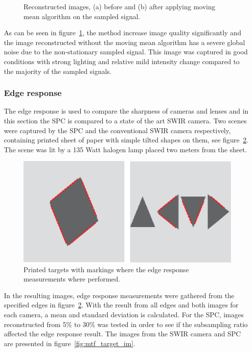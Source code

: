 \begin{figure}[H]
\begin{minipage}[t]{0.49\textwidth}
	\subcaption{}
	\label{lc_af}
\end{minipage}
	\caption{Reconstructed images, (a) before and (b) after applying moving mean algorithm on the sampled signal.}
	\label{fig:lc_image}
\end{figure}

As can be seen in figure~\ref{fig:lc_image}, the method increase image quality significantly and the image reconstructed without the moving mean algorithm has a severe global noise due to the non-stationary sampled signal. This image was captured in good conditions with strong lighting and relative mild intensity change compared to the majority of the sampled signals.


\subsubsection{Edge response}
The edge response is used to compare the sharpness of cameras and lenses and in this section the SPC is compared to a state of the art SWIR camera. Two scenes were captured by the SPC and the conventional SWIR camera respectively, containing printed sheet of paper with simple tilted shapes on them, see figure~\ref{fig:mtf_target}. The scene was lit by a 135 Watt halogen lamp placed two meters from the sheet.

\begin{figure}[H]
    \centering
    \includegraphics[width=0.8\linewidth]{result/mtf/Target.eps}
    \caption{Printed targets with markings where the edge response measurements where performed.}
    \label{fig:mtf_target}
\end{figure}

In the resulting images, edge response measurements were gathered from the specified edges in figure~\ref{fig:mtf_target}. With the result from all edges and both images for each camera, a mean and standard deviation is calculated. For the SPC, images reconstructed from 5\% to 30\% was tested in order to see if the subsampling ratio affected the edge response result. The images from the SWIR camera and SPC are presented in figure~\ref{fig:mtf_target_im}.

